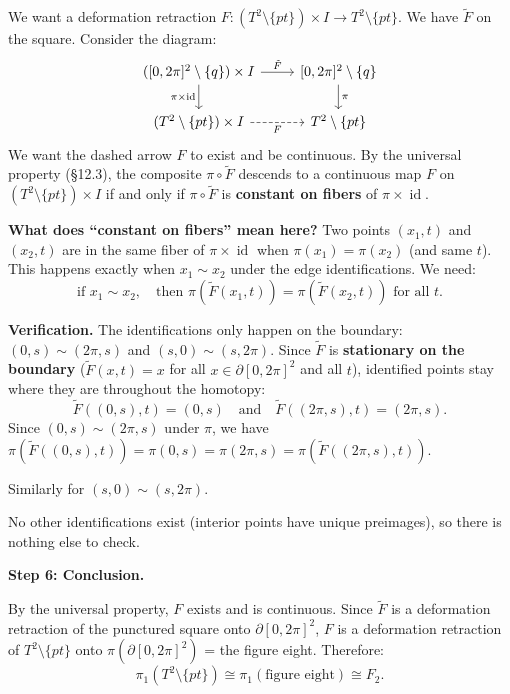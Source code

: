\documentclass[11pt]{report}
\begin{document}
\begin{exbox}
We want a deformation retraction $F: (T^2 \setminus \{pt\}) \times I \to T^2 \setminus \{pt\}$. We have $\tilde{F}$ on the square. Consider the diagram:
\[
\begin{tikzcd}
([0, 2\pi]^2 \setminus \{q\}) \times I \arrow[r, "\tilde{F}"] \arrow[d, "\pi \times \operatorname{id}"'] & {[0, 2\pi]^2 \setminus \{q\}} \arrow[d, "\pi"] \\
(T^2 \setminus \{pt\}) \times I \arrow[r, "F"', dashed] & T^2 \setminus \{pt\}
\end{tikzcd}
\]
We want the dashed arrow $F$ to exist and be continuous. By the universal property (\S 12.3), the composite $\pi \circ \tilde{F}$ descends to a continuous map $F$ on $(T^2 \setminus \{pt\}) \times I$ if and only if $\pi \circ \tilde{F}$ is \textbf{constant on fibers} of $\pi \times \operatorname{id}$.

\textbf{What does ``constant on fibers'' mean here?} Two points $(x_1, t)$ and $(x_2, t)$ are in the same fiber of $\pi \times \operatorname{id}$ when $\pi(x_1) = \pi(x_2)$ (and same $t$). This happens exactly when $x_1 \sim x_2$ under the edge identifications. We need:
\[\text{if } x_1 \sim x_2, \quad \text{then } \pi(\tilde{F}(x_1, t)) = \pi(\tilde{F}(x_2, t)) \text{ for all } t.\]

\textbf{Verification.} The identifications only happen on the boundary: $(0, s) \sim (2\pi, s)$ and $(s, 0) \sim (s, 2\pi)$. Since $\tilde{F}$ is \textbf{stationary on the boundary} ($\tilde{F}(x, t) = x$ for all $x \in \partial[0, 2\pi]^2$ and all $t$), identified points stay where they are throughout the homotopy:
\[\tilde{F}((0, s), t) = (0, s) \quad \text{and} \quad \tilde{F}((2\pi, s), t) = (2\pi, s).\]
Since $(0, s) \sim (2\pi, s)$ under $\pi$, we have $\pi(\tilde{F}((0,s), t)) = \pi(0, s) = \pi(2\pi, s) = \pi(\tilde{F}((2\pi, s), t))$. \checkmark

Similarly for $(s, 0) \sim (s, 2\pi)$. \checkmark

No other identifications exist (interior points have unique preimages), so there is nothing else to check.

\textbf{Step 6: Conclusion.}

By the universal property, $F$ exists and is continuous. Since $\tilde{F}$ is a deformation retraction of the punctured square onto $\partial[0, 2\pi]^2$, $F$ is a deformation retraction of $T^2 \setminus \{pt\}$ onto $\pi(\partial[0, 2\pi]^2)$ = the figure eight. Therefore:
\[\pi_1(T^2 \setminus \{pt\}) \cong \pi_1(\text{figure eight}) \cong F_2.\]


\end{exbox}
\end{document}
